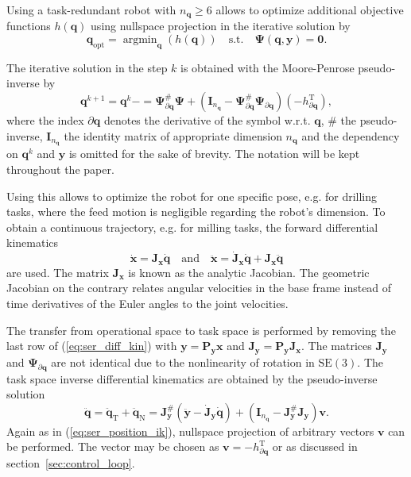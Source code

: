 \documentclass[a4paper,twoside]{article}
\newcommand{\transp}[0]{{\mathrm{T}}}
\DeclareMathOperator*{\argmin}{argmin}
\begin{document}
Using a task-redundant robot with $n_{\bm{q}} \geq 6$ allows to optimize additional objective functions $h(\bm{q})$ using nullspace projection in the iterative solution by
\begin{equation}
\bm{q}_{\mathrm{opt}}=\argmin_{\bm{q}}(h(\bm{q}))\quad\mathrm{s.t.}\quad \bm{\Psi}(\bm{q},\bm{y})=\bm{0}.
\end{equation}

The iterative solution in the step $k$ is obtained with the Moore-Penrose pseudo-inverse by
\begin{equation}
\bm{q}^{k+1}=\bm{q}^{k} - 
=
\bm{\Psi}_{\partial \bm{q}}^{\#}\bm{\Psi}+(\bm{I}_{n_{\bm{q}}}-\bm{\Psi}_{\partial \bm{q}}^{\#}\bm{\Psi}_{\partial \bm{q}}) (-h_{\partial \bm{q}}^\transp),
\label{eq:ser_position_ik}
\end{equation}
where the index $\partial \bm{q}$ denotes the derivative of the symbol w.r.t. $\bm{q}$, \# the pseudo-inverse, $\bm{I}_{n_{\bm{q}}}$ the identity matrix of appropriate dimension $n_{\bm{q}}$ and the dependency on $\bm{q}^{k}$ and $\bm{y}$ is omitted for the sake of brevity.
The notation will be kept throughout the paper.

Using this allows to optimize the robot for one specific pose, e.g. for drilling tasks, where the feed motion is negligible regarding the robot's dimension.
To obtain a continuous trajectory, e.g. for milling tasks, the forward differential kinematics 
\begin{equation}
\dot{\bm{x}}=\bm{J}_{\bm{x}} \dot{\bm{q}}\quad\mathrm{and}\quad \ddot{\bm{x}}=\dot{\bm{J}}_{\bm{x}} \dot{\bm{q}} + \bm{J}_{\bm{x}} \ddot{\bm{q}}
\label{eq:ser_diff_kin}
\end{equation}
are used.
The matrix $\bm{J}_{\bm{x}}$ is known as the analytic Jacobian.
The geometric Jacobian on the contrary relates angular velocities in the base frame instead of time derivatives of the Euler angles to the joint velocities.

The transfer from operational space to task space is performed by removing the last row of (\ref{eq:ser_diff_kin}) with $\bm{y}=\bm{P}_{\bm{y}} \bm{x}$ and $\bm{J}_{\bm{y}} = \bm{P}_{\bm{y}} \bm{J}_{\bm{x}}$. %
The matrices $\bm{J}_{\bm{y}}$ and $\bm{\Psi}_{\partial \bm{q}}$ are not identical due to the nonlinearity of rotation in $\mathrm{SE(3)}$.
The task space inverse differential kinematics are obtained by the pseudo-inverse solution
\begin{equation}
\ddot{\bm{q}}
=\ddot{\bm{q}}_\mathrm{T}+\ddot{\bm{q}}_\mathrm{N}
= \bm{J}_{\bm{y}}^{\#}(\ddot{\bm{y}} - \dot{\bm{J}}_{\bm{y}} \dot{\bm{q}}) + (\bm{I}_{n_{\bm{q}}}-\bm{J}_{\bm{y}}^{\#}\bm{J}_{\bm{y}}) \bm{v}.
\label{eq:ser_accel_ik}
\end{equation}
Again as in (\ref{eq:ser_position_ik}), nullspace projection of arbitrary vectors $\bm{v}$ can be performed.
The vector may be chosen as $\bm{v}=-h_{\partial \bm{q}}^\transp$ or as discussed in section~\ref{sec:control_loop}.
\end{document}

